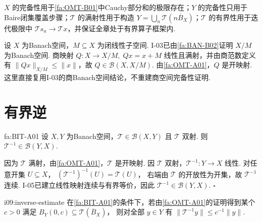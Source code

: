 \begin{FARemark}[四个假设各自出现的位置]
\(\displaystyle X\) 的完备性用于\autoref{fa:OMT-B01}中Cauchy部分和的极限存在；\(\displaystyle Y\) 的完备性只用于Baire闭集覆盖步骤；\(\displaystyle \mathcal T\) 的满射性用于构造 \(\displaystyle Y=\bigcup_n\mathcal T(n\overline B_X)\)；\(\displaystyle \mathcal T\) 的有界性用于迭代极限中 \(\displaystyle \mathcal T s_n\to\mathcal T x\)，并保证全章处于有界算子框架内.
\end{FARemark}

\begin{FAApplication}[商映射是开映射]\label{i09:quotient-map-open}
设 \(\displaystyle X\) 为Banach空间，\(\displaystyle M\subseteq X\) 为闭线性子空间. I-03已由\autoref{fa:BAN-B02}证明 \(\displaystyle X/M\) 为Banach空间. 商映射
\(\displaystyle Q:X\to X/M, \; Qx=x+M\)
线性且满射，并由商范数定义有 \(\displaystyle \|Qx\|_{X/M}\leqslant\|x\|\)，故 \(\displaystyle Q\in\mathcal B(X,X/M)\). 由\autoref{fa:OMT-A01}，\(\displaystyle Q\) 是开映射. 这里直接复用I-03的商Banach空间结论，不重建商空间完备性证明.
\end{FAApplication}

\section{有界逆}\label{sec:i09-bounded-inverse}

\begin{FACorollary}[A][有界逆定理]{fa:BIT-A01}
设 \(\displaystyle X,Y\) 为Banach空间，\(\displaystyle \mathcal T\in\mathcal B(X,Y)\) 且 \(\displaystyle \mathcal T\) 双射. 则
\(\displaystyle \mathcal T^{-1}\in\mathcal B(Y,X)\).
\end{FACorollary}

\begin{FAProof}
因为 \(\displaystyle \mathcal T\) 满射，由\autoref{fa:OMT-A01}，\(\displaystyle \mathcal T\) 是开映射. 因 \(\displaystyle \mathcal T\) 双射，\(\displaystyle \mathcal T^{-1}:Y\to X\) 线性. 对任意开集 \(\displaystyle U\subseteq X\)，
\(\displaystyle (\mathcal T^{-1})^{-1}(U)=\mathcal T(U)\)，
右端由 \(\displaystyle \mathcal T\) 的开放性为开集，故 \(\displaystyle \mathcal T^{-1}\) 连续. I-05已建立线性映射连续与有界等价，因此 \(\displaystyle \mathcal T^{-1}\in\mathcal B(Y,X)\).
\hfill\(\square\)
\end{FAProof}

\begin{FAProposition}[B][逆映射的定量估计]{i09:inverse-estimate}
在\autoref{fa:BIT-A01}的条件下，若由\autoref{fa:OMT-A01}的证明得到某个 \(\displaystyle c>0\) 满足
\(\displaystyle B_Y(0,c)\subseteq\mathcal T(\overline B_X)\)，
则对全部 \(\displaystyle y\in Y\) 有
\(\displaystyle \|\mathcal T^{-1}y\|\leqslant c^{-1}\|y\|\).
\end{FAProposition}

